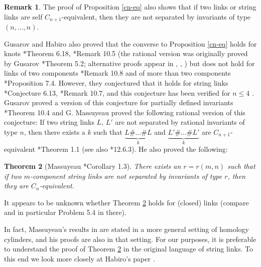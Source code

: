 \documentclass[a4paper,12pt,reqno,oneside]{amsart} %
\theoremstyle{plain}
\newtheorem{theorem}{Theorem}[section]
\theoremstyle{definition}
\newtheorem{remark}[theorem]{Remark}
\theoremstyle{named}
\renewcommand{\:}{\colon}
\begin{document}
\begin{remark} \label{self-colored}
The proof of Proposition \ref{cn-eq} also shows that if two links or string links are self $C_{n+1}$-equivalent, 
then they are not separated by invariants of type $(n,\dots,n)$.
\end{remark}

Gusarov and Habiro also proved that the converse to Proposition \ref{cn-eq} holds for knots 
\cite{Hab}*{Theorem 6.18}, \cite{Gu2}*{Remark 10.5} (the rational version was originally proved by Gusarov \cite{Gu1}*{Theorem 5.2};
alternative proofs appear in \cite{Sta2}, \cite{Fu}, \cite{Ya06}) but does not hold for links of two components \cite{Gu2}*{Remark 10.8}
and of more than two components \cite{Hab}*{Proposition 7.4}.
However, they conjectured that it holds for string links \cite{Hab}*{Conjecture 6.13}, \cite{Gu2}*{Remark 10.7},
and this conjecture has been verified for $n\le 4$ \cite{MY}.
Gusarov proved a version of this conjecture for partially defined invariants \cite{Gu2}*{Theorem 10.4} and
G. Massuyeau proved the following rational version of this conjecture: If two string links $L$, $L'$ are not separated
by rational invariants of type $n$, then there exists a $k$ such that $\underbrace{L\#\dots\#L}_k$ and 
$\underbrace{L'\#\dots\#L'}_k$ are $C_{n+1}$-equivalent \cite{Mass}*{Theorem 1.1} (see also \cite{CDM}*{12.6.3}).
He also proved the following:

\begin{theorem}[Massuyeau \cite{Mass}*{Corollary 1.3}] \label{massuyeau}
There exists an $r=r(m,n)$ such that if two $m$-component string links are not separated
by invariants of type $r$, then they are $C_n$-equivalent.
\end{theorem}

It appears to be unknown whether Theorem \ref{massuyeau} holds for (closed) links (compare \cite{HM} and 
in particular Problem 5.4 in there).

In fact, Massuyeau's results in \cite{Mass} are stated in a more general setting of homology cylinders, 
and his proofs are also in that setting.
For our purposes, it is preferable to understand the proof of Theorem \ref{massuyeau} in the original 
language of string links.
To this end we look more closely at Habiro's paper \cite{Hab}.
\end{document}
